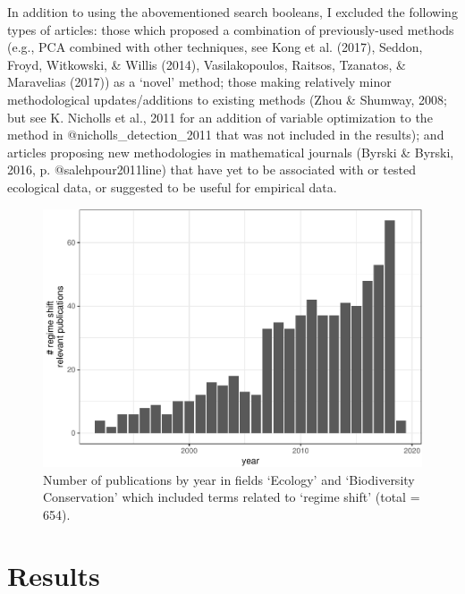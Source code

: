 \documentclass[12pt,twoside,openany]{reedthesis}
\begin{document}
In addition to using the abovementioned search booleans, I excluded the following types of articles: those which proposed a combination of previously-used methods (e.g., PCA combined with other techniques, see Kong et al. (2017), Seddon, Froyd, Witkowski, \& Willis (2014), Vasilakopoulos, Raitsos, Tzanatos, \& Maravelias (2017)) as a `novel' method; those making relatively minor methodological updates/additions to existing methods (Zhou \& Shumway, 2008; but see K. Nicholls et al., 2011 for an addition of variable optimization to the method in @nicholls\_detection\_2011 that was not included in the results); and articles proposing new methodologies in mathematical journals (Byrski \& Byrski, 2016, p. @salehpour2011line) that have yet to be associated with or tested ecological data, or suggested to be useful for empirical data.
\begin{figure}
\centering
\includegraphics{_myDissertation_files/figure-latex/wosRegimePubsByYear-1.pdf}
\caption{\label{fig:wosRegimePubsByYear}Number of publications by year in fields `Ecology' and `Biodiversity Conservation' which included terms related to `regime shift' (total = 654).}
\end{figure}
\hypertarget{results}{%
\section{Results}\label{results}}
\end{document}
